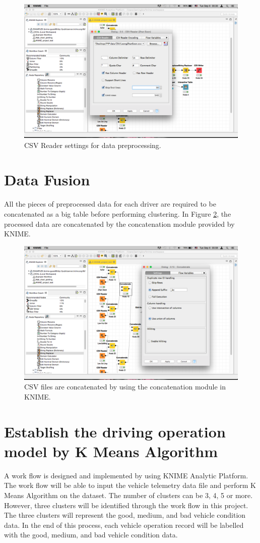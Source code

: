 \begin{figure}[hbt!]\centering
\includegraphics[width=.75\textwidth]{image/datapreprocessing}
\caption{CSV Reader settings for data preprocessing.}
\label{fig:preprocess}
\end{figure}

\section{Data Fusion}
All the pieces of preprocessed data for each driver are required to be concatenated as a big table before performing clustering. In Figure \ref{fig:KNIMEfile}, the processed data are concatenated by the concatenation module provided by KNIME.

\begin{figure}[hbt!]\centering
\includegraphics[width=.75\textwidth]{image/KNIMEconcatenate}
\caption{CSV files are concatenated by using the concatenation module in KNIME.}
\label{fig:KNIMEfile}
\end{figure}

\section{Establish the driving operation model by K Means Algorithm}
A work flow is designed and implemented by using KNIME Analytic Platform. The work flow will be able to input the vehicle telemetry data file and perform K Means Algorithm on the dataset. The number of clusters can be 3, 4, 5 or more. However, three clusters will be identified through the work flow in this project. The three clusters will represent the good, medium, and bad vehicle condition data. In the end of this process, each vehicle operation record will be labelled with the good, medium, and bad vehicle condition data.


